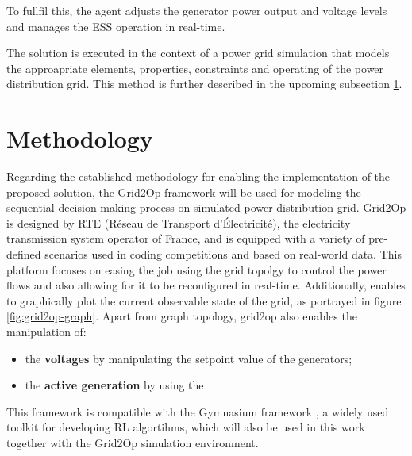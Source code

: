 To fullfil this, the agent adjusts the generator power output and voltage levels and manages the \ac{ESS} operation in real-time. \par
The solution is executed in the context of a power grid simulation that models the approapriate elements, properties, constraints and operating of the power distribution grid. This method is further described in the upcoming subsection \ref{sec:method}.

\section{Methodology} \label{sec:method}

Regarding the established methodology for enabling the implementation of the proposed solution, the Grid2Op framework \cite{rtefranceGrid2OpDocumentation}  will be used for modeling the sequential decision-making process on simulated power distribution grid. Grid2Op is designed by RTE (Réseau de Transport d'Électricité), the electricity transmission system operator of France, and is equipped with a variety of pre-defined scenarios used in coding competitions and based on real-world data. This platform focuses on easing the job using the grid topolgy to control the power flows and also allowing for it to be reconfigured in real-time. Additionally, enables to graphically plot the current observable state of the grid, as portrayed in figure \ref{fig:grid2op-graph}. Apart from graph topology, grid2op also enables the manipulation of:

\begin{itemize}
\item the \textbf{voltages} by manipulating the setpoint value of the generators;
\item the \textbf{active generation} by using the 
\end{itemize}

This framework is compatible with the Gymnasium framework \cite{faramafoundationGymnasiumDocumentation}, a widely used toolkit for developing \ac{RL} algortihms, which will also be used in this work together with the Grid2Op simulation environment. 


